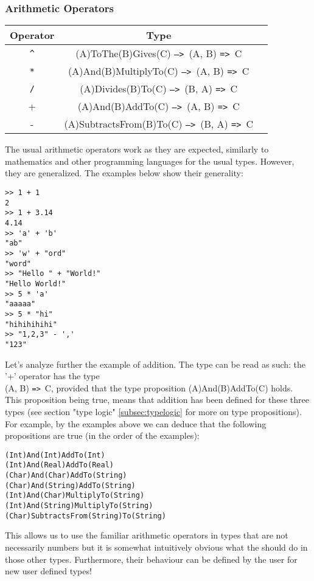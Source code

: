 \documentclass{article}
\def\ra{\texttt{=>}\ }
\def\Ra{\texttt{-->}\ }
\begin{document}
\subsubsection{Arithmetic Operators}
\begin{center}
\begin{tabular}{ |c|c|c| } 
\hline
Operator & Type \\ 
\hline
\hline
\texttt{\^} & (A)ToThe(B)Gives(C) \Ra (A, B) \ra C \\
\hline
\texttt{*} & (A)And(B)MultiplyTo(C) \Ra (A, B) \ra C \\
\hline
\texttt{/} & (A)Divides(B)To(C) \Ra (B, A) \ra C \\
\hline
+ & (A)And(B)AddTo(C) \Ra (A, B) \ra C \\ 
\hline
- & (A)SubtractsFrom(B)To(C) \Ra (B, A) \ra C \\
\hline
\end{tabular}
\end{center}
The usual arithmetic operators work as they are expected, similarly to
mathematics and other programming languages for the usual types. However, they
are generalized. The examples below show their generality:
\begin{verbatim}
>> 1 + 1
2
>> 1 + 3.14
4.14
>> 'a' + 'b'
"ab"
>> 'w' + "ord"
"word"
>> "Hello " + "World!"
"Hello World!"
>> 5 * 'a'
"aaaaa"
>> 5 * "hi"
"hihihihihi"
>> "1,2,3" - ','
"123"
\end{verbatim}
Let's analyze further the example of addition. The type can be read as such:
the '+' operator has the type \\ (A, B) \ra C, provided that the type
proposition (A)And(B)AddTo(C) holds. This proposition being true, means that
addition has been defined for these three types (see section "type logic"
\ref{subsec:typelogic} for more on type propositions). For example, by the examples
above we can deduce that the following propositions are true (in the order of the 
examples):
\begin{verbatim}
(Int)And(Int)AddTo(Int)
(Int)And(Real)AddTo(Real)
(Char)And(Char)AddTo(String)
(Char)And(String)AddTo(String)
(Int)And(Char)MultiplyTo(String)
(Int)And(String)MultiplyTo(String)
(Char)SubtractsFrom(String)To(String)
\end{verbatim}
This allows us to use the familiar arithmetic operators in types that are not
necessarily numbers but it is somewhat intuitively obvious what the should do
in those other types. Furthermore, their behaviour can be defined by the user
for new user defined types!
\end{document}
